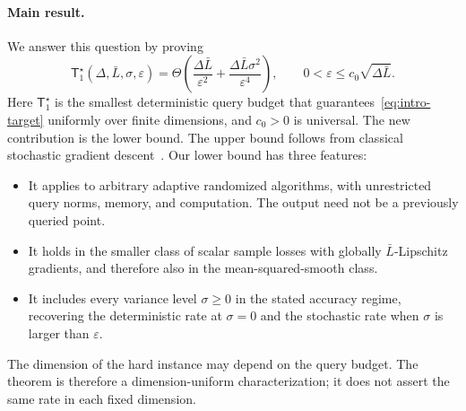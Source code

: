\documentclass[11pt]{article}
\newcommand{\eps}{\varepsilon}
\theoremstyle{definition}
\theoremstyle{remark}
\begin{document}
\paragraph{Main result.}
We answer this question by proving
\begin{equation}\label{eq:intro-rate}
 \mathsf T_1^\star(\Delta,\bar L,\sigma,\eps)
 =\Theta\!\left(
   \frac{\Delta\bar L}{\eps^2}
   +\frac{\Delta\bar L\sigma^2}{\eps^4}
 \right),
 \qquad 0<\eps\le c_0\sqrt{\Delta\bar L}.
\end{equation}
Here $\mathsf T_1^\star$ is the smallest deterministic query budget that
guarantees~\eqref{eq:intro-target} uniformly over finite dimensions, and
$c_0>0$ is universal. The new contribution is the lower bound. The upper
bound follows from classical stochastic gradient descent~\cite{ghadimi}.
Our lower bound has three features:
\begin{itemize}
 \item It applies to arbitrary adaptive randomized algorithms, with
 unrestricted query norms, memory, and computation. The output need not be a
 previously queried point.
 \item It holds in the smaller class of scalar sample losses with globally
 $\bar L$-Lipschitz gradients, and therefore also in the mean-squared-smooth
 class.
 \item It includes every variance level $\sigma\ge0$ in the stated accuracy
 regime, recovering the deterministic rate at $\sigma=0$ and the stochastic
 rate when $\sigma$ is larger than $\eps$.
\end{itemize}
The dimension of the hard instance may depend on the query budget. The
theorem is therefore a dimension-uniform characterization; it does not
assert the same rate in each fixed dimension.
\end{document}
